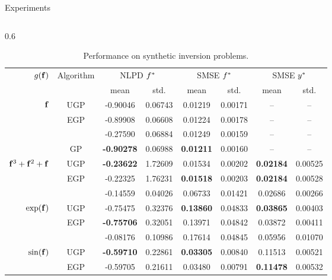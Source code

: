 \documentclass[final]{beamer}
\newlength{\twocolwid}
\begin{document}
\begin{frame}[t]
\begin{columns}[t]
\begin{column}{\twocolwid}
\begin{columns}[t,totalwidth=\twocolwid]
\begin{column}{\twocolwid}
\begin{block}{Experiments}
\begin{columns}
\begin{column}{0.6\twocolwid}
\begin{table}[tb]
    \caption[]{
        Performance on synthetic inversion problems.
        }
    \vspace{5mm}
    \small
    \begin{tabular}{r|c| c c c c c c}
        \multirow{2}{*}{$g\!\left({{\mathbf{f}}}\right)$} & \multirow{2}{*}{Algorithm} & 
            \multicolumn{2}{c}{NLPD $f^{*}$} &
            \multicolumn{2}{c}{SMSE $f^{*}$} &
            \multicolumn{2}{c}{SMSE $y^{*}$} \\
        & & mean & std. & mean & std. & mean & std.\\
        \toprule
        $\mathbf{f}$ 
& UGP & -0.90046 & 0.06743 & 0.01219 & 0.00171 & -- & -- \\
& EGP & -0.89908 & 0.06608 & 0.01224 & 0.00178 & -- & -- \\
& \cite{Opper2009} & -0.27590 & 0.06884 & 0.01249 & 0.00159 & -- & -- \\
& GP & \textbf{-0.90278} & 0.06988 & \textbf{0.01211} & 0.00160 & -- & -- \\
        \midrule
        $\mathbf{f}^3 + \mathbf{f}^2 + \mathbf{f}$ 
& UGP & \textbf{-0.23622} & 1.72609 & 0.01534 & 0.00202 & \textbf{0.02184} & 0.00525 \\
& EGP & -0.22325 & 1.76231 & \textbf{0.01518} & 0.00203 & \textbf{0.02184} & 0.00528 \\
& \cite{Opper2009} & -0.14559 & 0.04026 & 0.06733 & 0.01421 & 0.02686 & 0.00266 \\
        \midrule
        $\exp\!\left({\mathbf{f}}\right)$ 
& UGP & -0.75475 & 0.32376 & \textbf{0.13860} & 0.04833 & \textbf{0.03865} & 0.00403 \\
& EGP & \textbf{-0.75706} & 0.32051 & 0.13971 & 0.04842 & 0.03872 & 0.00411 \\
& \cite{Opper2009} & -0.08176 & 0.10986 & 0.17614 & 0.04845 & 0.05956 & 0.01070 \\
        \midrule
        $\sin\!\left({\mathbf{f}}\right)$ 
& UGP & \textbf{-0.59710} & 0.22861 & \textbf{0.03305} & 0.00840 & 0.11513 & 0.00521 \\
& EGP & -0.59705 & 0.21611 & 0.03480 & 0.00791 & \textbf{0.11478} & 0.00532 \\

\end{tabular}
\end{table}
\end{column}
\end{columns}
\end{block}
\end{column}
\end{columns}
\end{column}
\end{columns}
\end{frame}
\end{document}
